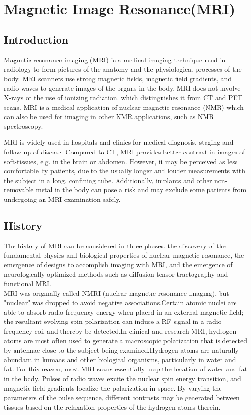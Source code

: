 \documentclass[12pt]{article}
\begin{document}
\section{Magnetic Image Resonance(MRI)}
\subsection{Introduction}
Magnetic resonance imaging (MRI) is a medical imaging technique used in radiology to form pictures of the anatomy and the physiological processes of the body. MRI scanners use strong magnetic fields, magnetic field gradients, and radio waves to generate images of the organs in the body. MRI does not involve X-rays or the use of ionizing radiation, which distinguishes it from CT and PET scans. MRI is a medical application of nuclear magnetic resonance (NMR) which can also be used for imaging in other NMR applications, such as NMR spectroscopy.

MRI is widely used in hospitals and clinics for medical diagnosis, staging and follow-up of disease. Compared to CT, MRI provides better contrast in images of soft-tissues, e.g. in the brain or abdomen. However, it may be perceived as less comfortable by patients, due to the usually longer and louder measurements with the subject in a long, confining tube. Additionally, implants and other non-removable metal in the body can pose a risk and may exclude some patients from undergoing an MRI examination safely.
\subsection{History}
The history of MRI can be considered in three phases: the discovery of the fundamental physics and biological properties of nuclear magnetic resonance, the emergence of designs to accomplish imaging with MRI, and the emergence of neurologically optimized methods such as diffusion tensor tractography and functional MRI.\\
MRI was originally called NMRI (nuclear magnetic resonance imaging), but "nuclear" was dropped to avoid negative associations.Certain atomic nuclei are able to absorb radio frequency energy when placed in an external magnetic field; the resultant evolving spin polarization can induce a RF signal in a radio frequency coil and thereby be detected.In clinical and research MRI, hydrogen atoms are most often used to generate a macroscopic polarization that is detected by antennae close to the subject being examined.Hydrogen atoms are naturally abundant in humans and other biological organisms, particularly in water and fat. For this reason, most MRI scans essentially map the location of water and fat in the body. Pulses of radio waves excite the nuclear spin energy transition, and magnetic field gradients localize the polarization in space. By varying the parameters of the pulse sequence, different contrasts may be generated between tissues based on the relaxation properties of the hydrogen atoms therein.
\end{document}
